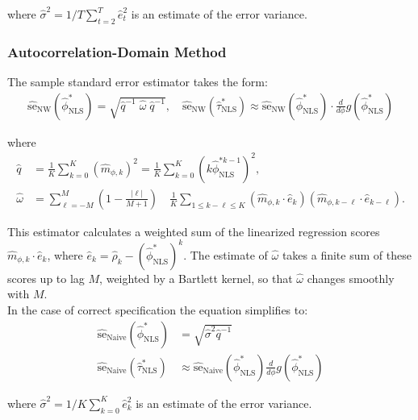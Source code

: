 \documentclass[main.tex]{subfiles}
\begin{document}
\noindent where $\hat\sigma^2 = 1/T \sum_{t=2}^T \hat e_t^2$ is an estimate of the error variance.

\subsubsection{Autocorrelation-Domain Method}\label{sec:stderr-autocorrelation-domain_}
The sample standard error estimator takes the form:
\begin{align}\label{eq:stderr-autocorrelation-domain_}
\widehat{\text{se}}_{\text{NW}}(\hat\phi^*_{\scriptscriptstyle\text{NLS}}) = \sqrt{\hat q^{-1}\;\hat\omega\; \hat q^{-1}}, \quad
\widehat{\text{se}}_{\text{NW}}(\hat\tau^*_{\scriptscriptstyle\text{NLS}}) \approx \widehat{\text{se}}_{\text{NW}}(\hat\phi^*_{\scriptscriptstyle\text{NLS}}) \cdot \frac{d}{d\phi} g(\hat\phi^*_{\scriptscriptstyle\text{NLS}})
\end{align}

\noindent where
\begin{align}
    \hat q &= \frac{1}{K} \sum_{k=0}^K (\hat m_{\phi,k})^2 = \frac{1}{K} \sum_{k=0}^K (k \hat\phi_{\scriptscriptstyle\text{NLS}}^{*k-1})^2,\\
    \hat \omega &= \sum_{\ell=-M}^M \left(1 - \frac{|\ell|}{M+1}\right) \quad \frac{1}{K} \sum_{1 \le k - \ell \le K} (\hat m_{\phi, k} \cdot \hat e_k) (\hat m_{\phi, k-\ell} \cdot \hat e_{k-\ell}).\label{eq:nls_q_omega_}
\end{align}

\noindent This estimator calculates a weighted sum of the linearized regression scores $\hat m_{\phi, k} \cdot \hat e_k$, where $\hat e_k = \hat\rho_k - (\hat\phi^*_{\scriptscriptstyle\text{NLS}})^k$. The estimate of $\hat\omega$ takes a finite sum of these scores up to lag $M$, weighted by a Bartlett kernel, so that $\hat\omega$ changes smoothly with $M$.\\

\noindent In the case of correct specification the equation simplifies to:
\begin{align} 
    \widehat{\text{se}}_\text{Naive}(\hat\phi^*_{\scriptscriptstyle\text{NLS}}) &= \sqrt{\hat\sigma^2 \hat q^{-1}}\\
    \widehat{\text{se}}_\text{Naive}(\hat\tau^*_{\scriptscriptstyle\text{NLS}}) &\approx \widehat{\text{se}}_{\text{Naive}}(\hat\phi^*_{\scriptscriptstyle\text{NLS}}) \frac{d}{d\phi} g(\hat\phi^*_{\scriptscriptstyle\text{NLS}})
\end{align}

\noindent where $\hat\sigma^2 = 1/K \sum_{k=0}^K \hat e_k^2$ is an estimate of the error variance.\\
\end{document}
